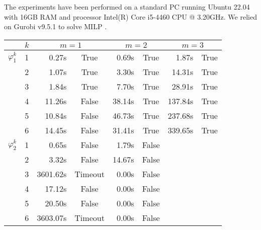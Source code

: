 The experiments have been performed on a standard PC running Ubuntu 22.04 with
16GB RAM and processor Intel(R) Core i5-4460 CPU @ 3.20GHz. We relied on Gurobi
v9.5.1 to solve MILP \cite{Gurobi+16a}.



\begin{table}
\centering
\begin{tabular}{ccrcrcrc}
  \toprule
  & $k$ & \multicolumn{2}{c}{$m = 1$} & \multicolumn{2}{c}{$m = 2$} & \multicolumn{2}{c}{$m = 3$}  \\\midrule
  $\varphi_1^k$ & 1 &       0.27s & True    &       0.69s & True    &       1.87s & True   \\
 & 2 &       1.07s & True    &       3.30s & True    &      14.31s & True   \\
 & 3 &       1.84s & True    &       7.70s & True    &      28.91s & True   \\
 & 4 &      11.26s & False   &      38.14s & True    &     137.84s & True   \\
 & 5 &      10.84s & False   &      46.73s & True    &     237.68s & True   \\
 & 6 &      14.45s & False   &      31.41s & True    &     339.65s & True   \\


  
  \midrule
  $\varphi_2^k$ & 1 &    0.65s & False   &     1.79s & False  \\
               & 2 &     3.32s & False   &    14.67s & False  \\
               & 3 &  3601.62s & Timeout &     0.00s & False  \\
               & 4 &    17.12s & False   &     0.00s & False  \\
               & 5 &    20.50s & False   &     0.00s & False  \\
               & 6 &  3603.07s & Timeout &     0.00s & False  \\


\bottomrule
\end{tabular}
  \label{tab:results}
\end{table}



